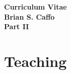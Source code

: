 \documentclass[12pt]{article}
\begin{document}


\begin{center}
\large
\bf Curriculum Vitae\\
 Brian S. Caffo \\ 
 Part II
\end{center}

\section*{Teaching}
\end{document}
